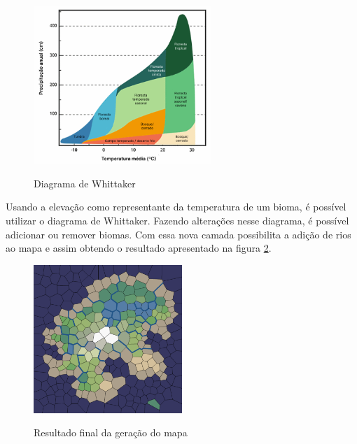 \begin{figure}[ht]
	\caption{Diagrama de Whittaker}
	\centering
	\includegraphics[width=0.6\textwidth]{figures/diagrama-whittaker.png}
	\label{fig:diagrama-whittaker}
\end{figure}

Usando a elevação como representante da temperatura de um bioma, é possível utilizar o diagrama de Whittaker. Fazendo alterações nesse diagrama, é possível adicionar ou remover biomas. Com essa nova camada possibilita a adição de rios ao mapa \space\cite{amitp2010} e assim obtendo o resultado apresentado na figura \ref{fig:biomes}.

\begin{figure}[ht]
	\caption{Resultado final da geração do mapa}
	\centering
	\includegraphics[width=0.5\textwidth]{figures/biomes.png}
	\label{fig:biomes}
\end{figure}


